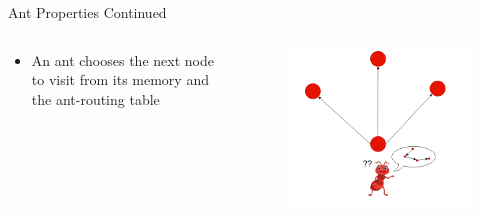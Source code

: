 \documentclass[table]{beamer}
\begin{document}
\begin{frame}{Ant Properties Continued}
	
	\begin{columns}
		
		
		\begin{column}{0.4\textwidth}
			\begin{itemize}
				\item	An ant chooses the next node to visit from its memory and the ant-routing table
			\end{itemize}
		\end{column}
		
		\begin{column}{0.6\textwidth}
			\begin{figure}
				\centering
				\includegraphics[width=\textwidth ]{WhereToGo.png}
			\end{figure}
		\end{column}
	\end{columns}
\end{frame}	
\end{document}
